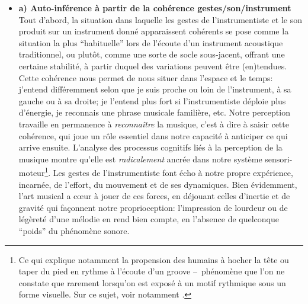 \vspace{-1em}
\begin{itemize}[noitemsep]
		\item \textbf{a) Auto-inférence à partir de la cohérence gestes/son/instrument}\\
	Tout d'abord, la situation dans laquelle les gestes de l'instrumentiste et le son produit sur un instrument donné apparaissent cohérents se pose comme la situation la plus ``habituelle'' lors de l'écoute d'un instrument acoustique traditionnel, ou plutôt, comme une sorte de socle sous-jacent, offrant une certaine stabilité, à partir duquel des variations peuvent être (en)tendues. 
	Cette cohérence nous permet de nous situer dans l'espace et le temps: j'entend différemment selon que je suis proche ou loin de l'instrument, à sa gauche ou à sa droite; je l'entend plus fort si l'instrumentiste déploie plus d'énergie, je reconnais une phrase musicale familière, etc. Notre perception travaille en permanence à \textit{reconnaître} la musique, c'est à dire à saisir cette cohérence, qui joue un rôle essentiel dans notre capacité à anticiper ce qui arrive ensuite. L'analyse des processus cognitifs liés à la perception de la musique montre qu'elle est \textit{radicalement} ancrée dans notre système sensori-moteur\footnote{Ce qui explique notamment la propension des humains à hocher la tête ou taper du pied en rythme à l'écoute d'un groove --~phénomène que l'on ne constate que rarement lorsqu'on est exposé à un motif rythmique sous un forme visuelle. Sur ce sujet, voir notamment \cite{zatorre_when_2007, maes_action-based_2014, maes_sensorimotor_2016}.}. Les gestes de l'instrumentiste font écho à notre propre expérience, incarnée, de l'effort, du mouvement et de ses dynamiques. Bien évidemment, l'art musical a cœur à jouer de ces forces, en déjouant celles d'inertie et de gravité qui façonnent notre proprioception: l'impression de lourdeur ou de légèreté d'une mélodie en rend bien compte, en l'absence de quelconque ``poids'' du phénomène sonore.\\

\end{itemize}
